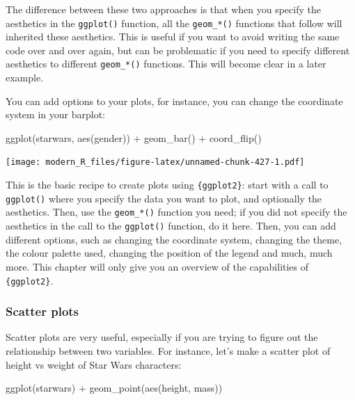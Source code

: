 \documentclass[
]{article}
\newenvironment{Shaded}{\begin{snugshade}}{\end{snugshade}}
\newcommand{\FunctionTok}[1]{\textcolor[rgb]{0.00,0.00,0.00}{#1}}
\newcommand{\NormalTok}[1]{#1}
\newcommand{\SpecialCharTok}[1]{\textcolor[rgb]{0.00,0.00,0.00}{#1}}
\begin{document}
The difference between these two approaches is that when you specify the aesthetics in the \texttt{ggplot()} function,
all the \texttt{geom\_*()} functions that follow will inherited these aesthetics. This is useful if you want to avoid
writing the same code over and over again, but can be problematic if you need to specify different aesthetics
to different \texttt{geom\_*()} functions. This will become clear in a later example.

You can add options to your plots, for instance, you can change the coordinate system in your barplot:

\begin{Shaded}
\begin{Highlighting}[]
\FunctionTok{ggplot}\NormalTok{(starwars, }\FunctionTok{aes}\NormalTok{(gender)) }\SpecialCharTok{+}
  \FunctionTok{geom\_bar}\NormalTok{() }\SpecialCharTok{+}
  \FunctionTok{coord\_flip}\NormalTok{()}
\end{Highlighting}
\end{Shaded}

\texttt{[image: modern\_R\_files/figure-latex/unnamed-chunk-427-1.pdf]}

This is the basic recipe to create plots using \texttt{\{ggplot2\}}: start with a call to \texttt{ggplot()} where you specify
the data you want to plot, and optionally the aesthetics. Then, use the \texttt{geom\_*()} function you need; if you
did not specify the aesthetics in the call to the \texttt{ggplot()} function, do it here. Then, you can add different
options, such as changing the coordinate system, changing the theme, the colour palette used, changing the
position of the legend and much, much more. This chapter will only give you an overview of the capabilities
of \texttt{\{ggplot2\}}.

\hypertarget{scatter-plots}{%
\subsubsection{Scatter plots}\label{scatter-plots}}

Scatter plots are very useful, especially if you are trying to figure out the relationship between two variables.
For instance, let's make a scatter plot of height vs weight of Star Wars characters:

\begin{Shaded}
\begin{Highlighting}[]
\FunctionTok{ggplot}\NormalTok{(starwars) }\SpecialCharTok{+}
  \FunctionTok{geom\_point}\NormalTok{(}\FunctionTok{aes}\NormalTok{(height, mass))}
\end{Highlighting}
\end{Shaded}
\end{document}
